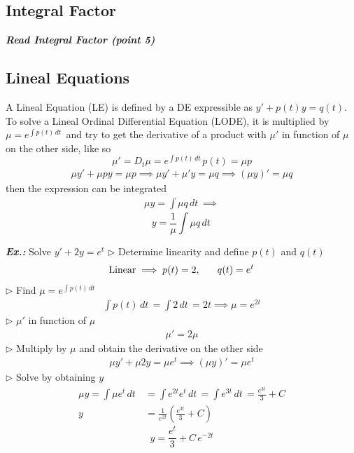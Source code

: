 \documentclass[a4paper]{article}
\begin{document}
\subsection{Integral Factor}
\textbf{\textit{Read Integral Factor (point 5)}}

\subsection{Lineal Equations}
A Lineal Equation (LE) is defined by a DE expressible as $y'+p(t)y=q(t)$. To solve a Lineal Ordinal Differential Equation (LODE), it is multiplied by $\mu=e^{ \int p(t) \, dt\, }$  and try to get the derivative of a product with $\mu'$ in function of $\mu$ on the other side, like so
$$
\mu'=D_{t}\mu=e^{ \int p(t) \, dt\,  }p(t)=\mu p
$$
\begin{align}
\mu y'+\mu py=\mu p\implies \mu y'+\mu'y=\mu q\implies(\mu y)'=\mu q
\end{align}
then the expression can be integrated
\begin{align}
\mu y=\int \mu q \, dt\, \implies
\end{align}
$$
\boxed{y=\frac{1}{\mu}\int \mu q \, dt\, }
$$

\textbf{\textit{Ex.: }}Solve $y'+2y=e^{t}$
$\triangleright$ Determine linearity and define $p(t)$ and $q(t)$
$$
\text{Linear}\implies p(t)=2,\hspace{4ex}q(t)=e^{ t }
$$
$\triangleright$ Find $\mu=e^{ \int p(t) \, dt\, }$
\begin{align}
\int p(t) \, dt\, =\int 2 \, dt\, =2t\implies \mu=e^{ 2t }
\end{align}
$\triangleright$ $\mu'$ in function of $\mu$
\begin{align}
\mu'=2\mu
\end{align}
$\triangleright$ Multiply by $\mu$ and obtain the derivative on the other side
\begin{align}
\mu y'+\mu 2y=\mu e^{ t }\implies(\mu y)'=\mu e^{ t }
\end{align}
$\triangleright$ Solve by obtaining $y$
\begin{align}
\mu y=\int \mu e^{ t } \, dt\, &=\int e^{ 2t }e^{ t } \, dt\, =\int e^{ 3t } \, dt\, =\frac{e^{ 3t }}{3}+C \\
y&=\frac{1}{e^{ 2t }}\left( \frac{e^{ 3t }}{3}+C \right)
\end{align}
$$
\boxed{y=\frac{e^{ t }}{3}+C\,e^{ -2t }}
$$
\end{document}
